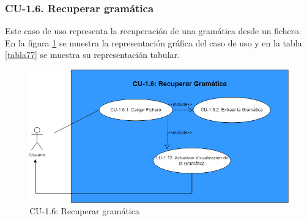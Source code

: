  \subsubsection{CU-1.6. Recuperar gramática}

 Este caso de uso representa la recuperación de una gramática desde un fichero. En la figura \ref{fig:CU16} se muestra la representación gráfica del caso de uso y en la tabla \ref{tabla77} se muestra su representación tabular.

  \begin{figure}[H]
       \begin{center} 
 	\includegraphics[scale=0.55]{figuras/Cap7/CU16.png}
 	\caption{CU-1.6: Recuperar gramática}
 	\label{fig:CU16}
       \end{center}
   \end{figure}

